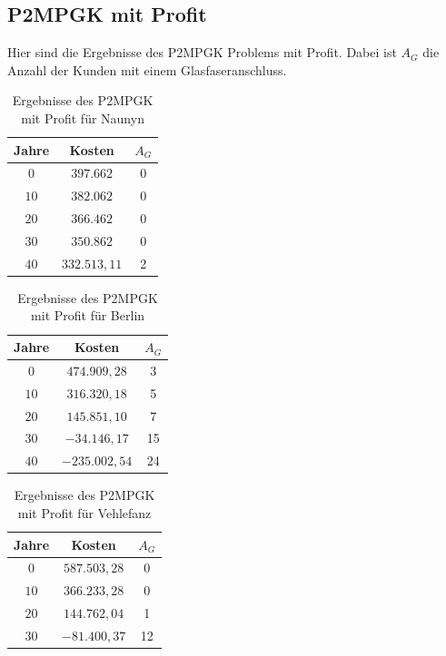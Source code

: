 \documentclass[11pt,a4paper]{article}
\theoremstyle{my_th_style1}
\begin{document}
\vspace{5cm}

\subsection*{P2MPGK mit Profit}
Hier sind die Ergebnisse des P2MPGK Problems mit Profit. Dabei ist $A_G$ die Anzahl der Kunden mit einem Glasfaseranschluss.

\begin{table}[!htbp]
	\centering
	\begin{tabular}{c|c|c}
		\centering
		Jahre & Kosten & $A_G$ \\	
		\hline
		$0$   	 & \(397.662\) & 0  \\
		$10$ 	&  \(382.062\) & 0  \\
		$20$   	&  \(366.462\)  & 0  \\
		$30$    &  \(350.862\) & 0  \\
		$40$    &  \(332.513,11\)  & 2 \\
	\end{tabular}
	\caption{Ergebnisse des P2MPGK mit Profit f\"ur Naunyn} 
	\label{P2MPGKProfitN}
\end{table}

\begin{table}[!htbp]
	\centering
	\begin{tabular}{c|c|c}
		\centering
		Jahre & Kosten & $A_G$ \\	
		\hline
		$0$   	 &  \(474.909,28\) & 3  \\
		$10$ 	&  \(316.320,18\) & 5  \\
		$20$   	&   \(145.851,10\) & 7  \\
		$30$    &   $ -34.146,17$	& 15  \\
		$40$    & $-235.002,54$ &  24 \\
	\end{tabular}
	\caption{Ergebnisse des P2MPGK mit Profit f\"ur Berlin}
	\label{P2MPGKProfitB}
\end{table}

\begin{table}[!htbp]
	\centering
	\begin{tabular}{c|c|c}
		\centering
		Jahre & Kosten & $A_G$ \\	
		\hline
		$0$   	 & $587.503,28$ &0  \\
		$10$ 	& $366.233,28$ & 0  \\
		$20$   	&  $144.762,04$  & 1  \\
		$30$    &  $-81.400,37$ & 12 \\
	\end{tabular}
	\caption{Ergebnisse des P2MPGK mit Profit f\"ur Vehlefanz} 
	\label{P2MPGKProfitV}
\end{table}

\thispagestyle{empty}
\end{document}
